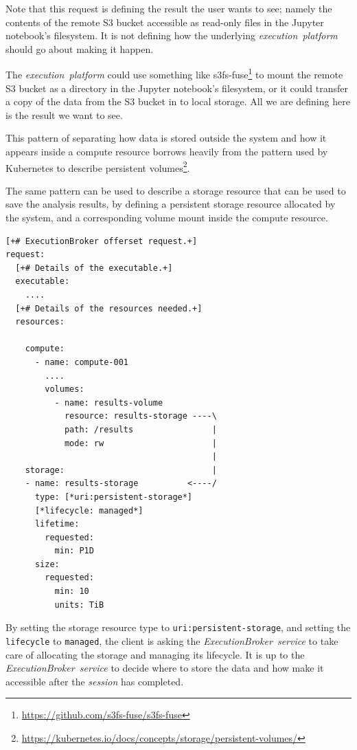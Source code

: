 \documentclass[11pt,a4paper]{ivoa}
\newcommand{\execbrokerservice}[1] {\textit{ExecutionBroker~service#1}}
\newcommand{\execplatform} {\textit{execution~platform}}
\newcommand{\workerjob}[1] {\textit{session#1}}
\newcommand{\jupyternotebook} {Jupyter notebook}
\newcommand{\kubernetes} {Kubernetes}
\newcommand{\codeword}[1] {\texttt{#1}}
\newcommand{\footurl}[1] {\footnote{\url{#1}}}
\begin{document}
Note that this request is defining the result the user wants to see;
namely the contents of the remote S3 bucket accessible as read-only files
in the \jupyternotebook{'s} filesystem.
It is not defining how the underlying \execplatform{} should go about making
it happen.

The \execplatform{} could use something like
s3fs-fuse\footurl{https://github.com/s3fs-fuse/s3fs-fuse} to mount the remote
S3 bucket as a directory in the \jupyternotebook{'s} filesystem,
or it could transfer a copy of the data from the S3 bucket in to local storage.
All we are defining here is the result we want to see.

This pattern of separating how data is stored outside the system
and how it appears inside a compute resource borrows heavily from the
pattern used by \kubernetes{} to describe persistent
volumes\footurl{https://kubernetes.io/docs/concepts/storage/persistent-volumes/}.

The same pattern can be used to describe a storage resource that can be used
to save the analysis results, by defining a persistent storage resource
allocated by the system, and a corresponding volume mount inside the compute resource.

\begin{lstlisting}[]
[+# ExecutionBroker offerset request.+]
request:
  [+# Details of the executable.+]
  executable:
    ....
  [+# Details of the resources needed.+]
  resources:

    compute:
      - name: compute-001
        ....
        volumes:
          - name: results-volume
            resource: results-storage ----\
            path: /results                |
            mode: rw                      |
                                          |
    storage:                              |
    - name: results-storage          <----/
      type: [*uri:persistent-storage*]
      [*lifecycle: managed*]
      lifetime:
        requested:
          min: P1D
      size:
        requested:
          min: 10
          units: TiB
\end{lstlisting}

By setting the storage resource type to \codeword{uri:persistent-storage},
and setting the \codeword{lifecycle} to \codeword{managed},
the client is asking the \execbrokerservice{} to take care of allocating
the storage and managing its lifecycle.
It is up to the \execbrokerservice{} to decide where to store the data and
how make it accessible after the \workerjob{} has completed.
\end{document}
